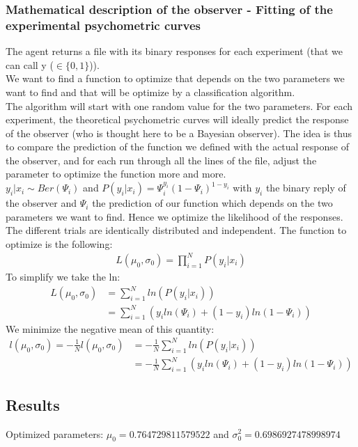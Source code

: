 \documentclass{article}
\begin{document}
\subsubsection*{Mathematical description of the observer - Fitting of the experimental psychometric curves}
The agent returns a file with its binary responses for each experiment (that we can call y ($\in \{0,1\}$)).\\
We want to find a function to optimize that depends on the two parameters we want to find and that will be optimize by a classification algorithm.\\
The algorithm will start with one random value for the two parameters. For each experiment, the theoretical psychometric curves will ideally predict the response of the observer (who is thought here to be a Bayesian observer). The idea is thus to compare the prediction of the function we defined with the actual response of the observer, and for each run through all the lines of the file, adjust the parameter to optimize the function more and more.\\
$y_i|x_i \sim Ber(\Psi_i)$ and $P(y_i|x_i)=\Psi_i^{y_i}(1-\Psi_i)^{1-y_i}$ with $y_i$ the binary reply of the observer and $\Psi_i$ the prediction of our function which depends on the two parameters we want to find. Hence we optimize the likelihood of the responses.\\
The different trials are identically distributed and independent. The function to optimize is the following:\\
\begin{align*}
        L(\mu_0, \sigma_0)=\prod_{i=1}^{N} P(y_i|x_i)
\end{align*}
To simplify we take the ln:\\

\begin{align*}
        L(\mu_0, \sigma_0)&=\sum_{i=1}^{N} ln(P(y_i|x_i))\\
        &= \sum_{i=1}^{N} (y_iln(\Psi_i)+(1-y_i)ln(1-\Psi_i))
\end{align*}
We minimize the negative mean of this quantity:
\begin{align*}
        l(\mu_0, \sigma_0)=-\frac{1}{N}l(\mu_0, \sigma_0)&=-\frac{1}{N}\sum_{i=1}^{N} ln(P(y_i|x_i))\\
        &= -\frac{1}{N}\sum_{i=1}^{N} (y_iln(\Psi_i)+(1-y_i)ln(1-\Psi_i))
\end{align*}

\subsection*{Results}
Optimized parameters: $\mu_0 = 0.764729811579522$ and  $\sigma^2_0 = 0.6986927478998974$
\end{document}
